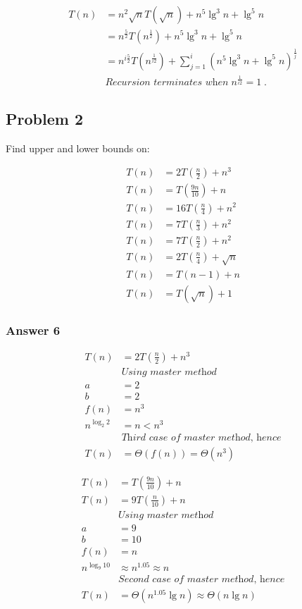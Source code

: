 \documentclass[11pt]{article}
\begin{document}
\begin{align*}
  T(n) &= n^2 \sqrt{n} T\left(\sqrt{n}\right) + n^5 \lg^3 n + \lg^5 n \\
       &= n^{\frac{5}{2}} T\left(n^{\frac{1}{2}}\right) + n^5 \lg^3 n + \lg^5 n \\
       &= n^{i\frac{5}{2}} T\left(n^{\frac{1}{i2}}\right) + \sum_{j=1}^i(n^5 \lg^3 n + \lg^5 n)^{\frac{1}{j}} \\
       &\textit{Recursion terminates when}\; n^{\frac{1}{i2}} = 1\;.
\end{align*}

\subsection{Problem 2}
\label{sec:orgheadline8}
Find upper and lower bounds on:

\begin{align*}
  T(n) &= 2T(\frac{n}{2}) + n^3 \\
  T(n) &= T(\frac{9n}{10}) + n \\
  T(n) &= 16T(\frac{n}{4}) + n^2 \\
  T(n) &= 7T(\frac{n}{3}) + n^2 \\
  T(n) &= 7T(\frac{n}{2}) + n^2 \\
  T(n) &= 2T(\frac{n}{4}) + \sqrt{n} \\
  T(n) &= T(n - 1) + n \\
  T(n) &= T(\sqrt{n}) + 1
\end{align*}

\subsubsection{Answer 6}
\label{sec:orgheadline7}
\begin{align*}
  T(n) &= 2T(\frac{n}{2}) + n^3 \\
  &\textit{Using master method} \\
  a &= 2 \\
  b &= 2 \\
  f(n) &= n^3 \\
  n^{\log_2 2} &= n < n^3 \\
  &\textit{Third case of master method, hence} \\
  T(n) &= \Theta(f(n)) = \Theta(n^3)
\end{align*}

\begin{align*}
  T(n) &= T(\frac{9n}{10}) + n \\
  T(n) &= 9T(\frac{n}{10}) + n \\
  &\textit{Using master method} \\
  a &= 9 \\
  b &= 10 \\
  f(n) &= n \\
  n^{\log_9 10} &\approx n^{1.05} \approx n \\
  &\textit{Second case of master method, hence} \\
  T(n) &= \Theta(n^{1.05}\lg n) \approx \Theta(n\lg n)
\end{align*}
\end{document}
